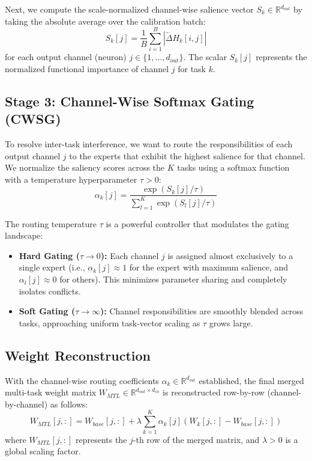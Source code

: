 Next, we compute the scale-normalized channel-wise salience vector $S_k \in \mathbb{R}^{d_{out}}$ by taking the absolute average over the calibration batch:
\begin{equation}
S_k[j] = \frac{1}{B} \sum_{i=1}^B \left| \tilde{\Delta} H_k[i, j] \right|
\end{equation}
for each output channel (neuron) $j \in \{1, \dots, d_{out}\}$. The scalar $S_k[j]$ represents the normalized functional importance of channel $j$ for task $k$.

\subsection{Stage 3: Channel-Wise Softmax Gating (CWSG)}
To resolve inter-task interference, we want to route the responsibilities of each output channel $j$ to the experts that exhibit the highest salience for that channel. We normalize the saliency scores across the $K$ tasks using a softmax function with a temperature hyperparameter $\tau > 0$:
\begin{equation}
\alpha_k[j] = \frac{\exp(S_k[j] / \tau)}{\sum_{l=1}^K \exp(S_l[j] / \tau)}
\end{equation}

The routing temperature $\tau$ is a powerful controller that modulates the gating landscape:
\begin{itemize}
    \item \textbf{Hard Gating ($\tau \to 0$):} Each channel $j$ is assigned almost exclusively to a single expert (i.e., $\alpha_k[j] \approx 1$ for the expert with maximum salience, and $\alpha_l[j] \approx 0$ for others). This minimizes parameter sharing and completely isolates conflicts.
    \item \textbf{Soft Gating ($\tau \to \infty$):} Channel responsibilities are smoothly blended across tasks, approaching uniform task-vector scaling as $\tau$ grows large.
\end{itemize}

\subsection{Weight Reconstruction}
With the channel-wise routing coefficients $\alpha_k \in \mathbb{R}^{d_{out}}$ established, the final merged multi-task weight matrix $W_{MTL} \in \mathbb{R}^{d_{out} \times d_{in}}$ is reconstructed row-by-row (channel-by-channel) as follows:
\begin{equation}
W_{MTL}[j, :] = W_{base}[j, :] + \lambda \sum_{k=1}^K \alpha_k[j] \left(W_k[j, :] - W_{base}[j, :]\right)
\end{equation}
where $W_{MTL}[j, :]$ represents the $j$-th row of the merged matrix, and $\lambda > 0$ is a global scaling factor.


